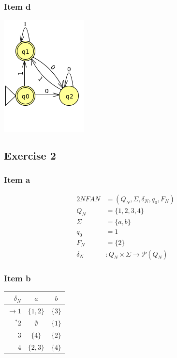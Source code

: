 {\subsubsection{Item d}
\begin{center} \includegraphics[scale=0.5]{TP06_1_d} \end{center}
\subsection{Exercise 2}
\subsubsection{Item a}
\begin{alignat*}{2}
	NFA N    &= (Q_N, \Sigma, \delta_N, q_0, F_N)\\
	Q_N      &= \{1,2,3,4\}\\
	\Sigma   &= \{a,b\}\\
	q_0      &= 1\\
	F_N      &= \{2\}\\
	\delta_N &\colon Q_N \times \Sigma \rightarrow \mathscr{P}(Q_N)
\end{alignat*}
\subsubsection{Item b}
\begin{center} \begin{tabular}{r | c c}
	$\delta_N     $ & $a      $ & $b    $ \\ \hline
	$\rightarrow 1$ & $\{1,2\}$ & $\{3\}$ \\
	$      ^* 2$ & $\emptyset$ & $\{1\}$ \\
	$            3$ & $\{4\}  $ & $\{2\}$ \\
	$            4$ & $\{2,3\}$ & $\{4\}$
\end{tabular} \end{center}
}
